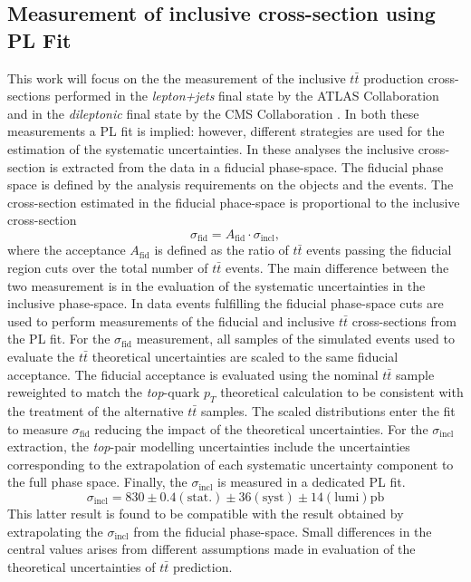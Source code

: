 \documentclass[12pt]{article}
\begin{document}
\subsection{Measurement of inclusive cross-section using PL Fit}
This work will focus on the the measurement of the inclusive $t\bar{t}$ production cross-sections performed in the \emph{lepton+jets} final state by the ATLAS Collaboration \cite{Aad_2020} and in the \emph{dileptonic} final state by the CMS Collaboration \cite{CMS_inclusive}. In both these measurements a PL fit is implied: however, different strategies are used for the estimation of the systematic uncertainties. 
In these analyses the inclusive cross-section is extracted from the data in a fiducial phase-space. The fiducial phase space is defined by the analysis requirements on the objects and the events. The cross-section estimated in the fiducial phace-space is proportional to the inclusive cross-section
\begin{equation}
\sigma_{\mathrm{fid}} = A_{\mathrm{fid}} \cdot \sigma_{\mathrm{incl}}, 
\end{equation}
where the acceptance $A_{\mathrm{fid}}$ is defined as the ratio of $t\bar{t}$ events passing the fiducial region cuts over the total number of $t\bar{t}$ events.
The main difference between the two measurement is in the evaluation of the systematic uncertainties in the inclusive phase-space. 
In \cite{Aad_2020} data events fulfilling the fiducial phase-space cuts are used to perform measurements of the fiducial and inclusive $t\bar{t}$ cross-sections from the PL fit. For the $\sigma_{\mathrm{fid}}$ measurement, all samples of the simulated events used to evaluate the $t\bar{t}$ theoretical uncertainties are scaled to the same fiducial acceptance. 
The fiducial acceptance is evaluated using the nominal $t\bar{t}$ sample reweighted to match the \emph{top}-quark $p_T$ theoretical calculation to be consistent with the treatment of the alternative $t\bar{t}$ samples. The scaled distributions enter the fit to measure $\sigma_{\mathrm{fid}}$ reducing the impact of the theoretical uncertainties. For the $\sigma_{\mathrm{incl}}$ extraction, the \emph{top}-pair modelling uncertainties include the uncertainties corresponding to the extrapolation of each systematic uncertainty component to the full phase space. 
Finally, the $\sigma_{\mathrm{incl}}$ is measured in a dedicated PL fit. 
\begin{equation}
\sigma_{\mathrm{incl}} = 830\pm0.4(\mathrm{stat.})\pm36(\mathrm{syst})\pm14(\mathrm{lumi})\mathrm{pb}
\end{equation}
This latter result is found to be compatible with the result obtained by extrapolating the $\sigma_{\mathrm{incl}}$ from the fiducial phase-space. Small differences in the central values arises from different assumptions made in evaluation of the theoretical uncertainties of $t\bar{t}$ prediction.
\end{document}

